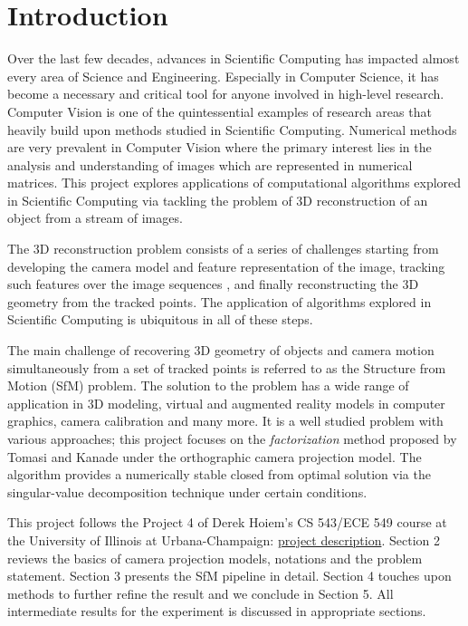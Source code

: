 \section{Introduction}
Over the last few decades, advances in Scientific Computing has
impacted almost every area of Science and Engineering. Especially in
Computer Science, it has become a necessary and critical tool for anyone involved in high-level
research. Computer Vision is one of the quintessential examples of research areas that heavily build upon
methods studied in Scientific Computing. Numerical methods are very
prevalent in Computer Vision where the primary interest
lies in the analysis and understanding of images which are represented
in numerical matrices. This project explores applications of
computational algorithms explored in Scientific Computing via tackling
the problem of 3D reconstruction of an object from a stream of images.

The 3D reconstruction problem consists of a series of challenges starting from developing the
camera model and feature representation of the image,
tracking such features over the image sequences , and finally
reconstructing the 3D geometry from the tracked points. The application of algorithms explored in
Scientific Computing is ubiquitous in all of these steps. 

The main challenge of recovering 3D geometry of objects and camera
motion simultaneously from a set of tracked points is referred to as the Structure from Motion (SfM) problem. The solution to the problem has a
wide range of application in 3D modeling, virtual and augmented
reality models in computer graphics, camera calibration and many
more. It is a well studied problem with various approaches; this project focuses on the \emph{factorization} method proposed by Tomasi and Kanade
\cite{Tomasi} under the orthographic camera projection model. The
algorithm provides a numerically stable closed from optimal solution
via the singular-value decomposition technique under certain
conditions. \cite[p. 435]{AZ}

This project follows the Project 4 of Derek Hoiem's CS 543/ECE 549
course at the University of Illinois at Urbana-Champaign:
\href{http://www.cs.illinois.edu/class/sp11/cs543/hw/hw4.pdf}{project
  description}. Section 2 reviews the basics of camera projection
models, notations and the problem statement. Section 3 presents the
SfM pipeline in detail. Section 4 touches upon methods to further
refine the result and we conclude in Section 5. All intermediate
results for the experiment is discussed in appropriate sections.

